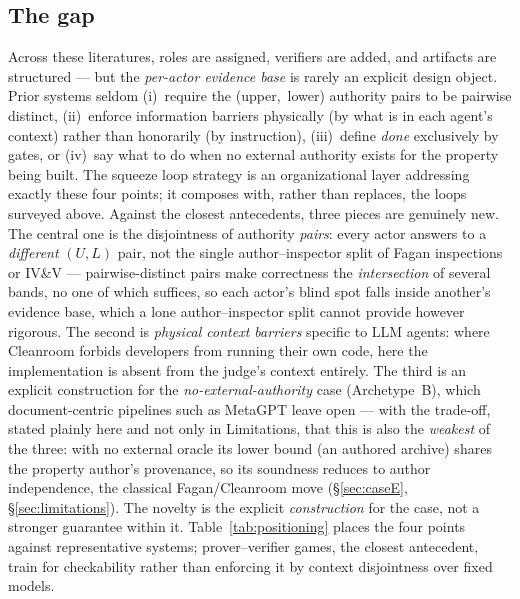 \documentclass[11pt]{article}
\begin{document}
\subsection{The gap}

Across these literatures, roles are assigned, verifiers are added, and
artifacts are structured --- but the \emph{per-actor evidence base} is rarely
an explicit design object. Prior systems seldom (i)~require the
(upper,~lower) authority pairs to be pairwise distinct, (ii)~enforce
information barriers physically (by what is in each agent's context)
rather than honorarily (by instruction), (iii)~define \emph{done} exclusively
by gates, or (iv)~say what to do when no external authority exists for the
property being built.
The squeeze loop strategy is an organizational layer addressing exactly these four points; it
composes with, rather than replaces, the loops surveyed above. Against the closest antecedents,
three pieces are genuinely new. The central one is the disjointness of authority \emph{pairs}:
every actor answers to a \emph{different} $(U,L)$ pair, not the single author--inspector split of
Fagan inspections or IV\&V --- pairwise-distinct pairs make correctness the \emph{intersection}
of several bands, no one of which suffices, so each actor's blind spot falls inside another's
evidence base, which a lone author--inspector split cannot provide however rigorous. The second
is \emph{physical context barriers} specific to LLM agents: where Cleanroom forbids developers
from running their own code, here the implementation is absent from the judge's context entirely.
The third is an explicit construction for the \emph{no-external-authority} case (Archetype~B),
which document-centric pipelines such as MetaGPT leave open --- with the trade-off, stated plainly
here and not only in Limitations, that this is also the \emph{weakest} of the three: with no
external oracle its lower bound (an authored archive) shares the property author's provenance, so
its soundness reduces to author independence, the classical Fagan/Cleanroom move (\S\ref{sec:caseE},
\S\ref{sec:limitations}). The novelty is the explicit \emph{construction} for the case, not a
stronger guarantee within it. Table~\ref{tab:positioning} places
the four points against representative systems; prover--verifier games, the closest antecedent,
train for checkability rather than enforcing it by context disjointness over fixed models.
\end{document}
